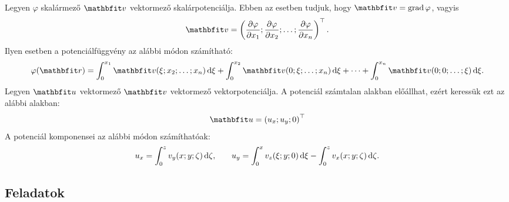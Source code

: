 \documentclass{szb-practice}
\begin{document}
\begin{blueBox}[][nobreak]

  Legyen $\varphi$ skalármező $\rvec v$ vektormező skalárpotenciálja. Ebben
  az esetben tudjuk, hogy $\rvec v = \grad \varphi$, vagyis
  $$
    \rvec v = \left(
    \pdv{\varphi}{x_1};
    \pdv{\varphi}{x_2};
    \dots;
    \pdv{\varphi}{x_n}
    \right)^\T
    \text.
  $$
  Ilyen esetben a potenciálfüggvény az alábbi módon számítható:
  $$
    \varphi (\coordvec)
    = \int_0^{x_1} \rvec v(\xi; x_2; \dots; x_n) \dd \xi
    + \int_0^{x_2} \rvec v(0; \xi; \dots; x_n) \dd \xi
    + \dots
    + \int_0^{x_n} \rvec v(0; 0; \dots; \xi) \dd \xi
    \text.
  $$
  Legyen $\rvec u$ vektormező $\rvec v$ vektormező vektorpotenciálja.
  A potenciál számtalan alakban előállhat, ezért keressük ezt az alábbi alakban:
  $$
    \rvec u = \left( u_x; u_y; 0 \right)^\T
  $$
  A potenciál komponensei az alábbi módon számíthatóak:
  $$
    u_x = \int_0^z v_y(x; y; \zeta) \mathop{}\!\mathrm{d} \zeta
    \text,
    \qquad
    u_y = \int_0^x v_z(\xi; y; 0) \mathop{}\!\mathrm{d} \xi
    - \int_0^z v_x(x; y; \zeta) \mathop{}\!\mathrm{d} \zeta
    \text.
  $$
\end{blueBox}

\clearpage
\subsection{Feladatok}
\end{document}
